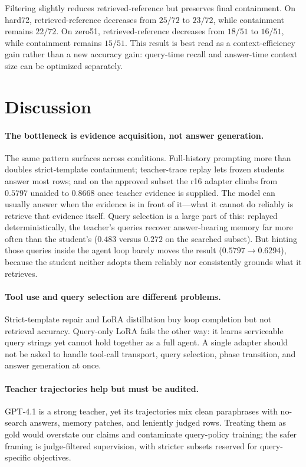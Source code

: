 \documentclass[11pt]{article}
\begin{document}
Filtering slightly reduces retrieved-reference but preserves final containment. On hard72, retrieved-reference decreases from $25/72$ to $23/72$, while containment remains $22/72$. On zero51, retrieved-reference decreases from $18/51$ to $16/51$, while containment remains $15/51$. This result is best read as a context-efficiency gain rather than a new accuracy gain: query-time recall and answer-time context size can be optimized separately.

\section{Discussion}

\paragraph{The bottleneck is evidence acquisition, not answer generation.}
The same pattern surfaces across conditions. Full-history prompting more than doubles strict-template containment; teacher-trace replay lets frozen students answer most rows; and on the approved subset the r16 adapter climbs from $0.5797$ unaided to $0.8668$ once teacher evidence is supplied. The model can usually answer when the evidence is in front of it---what it cannot do reliably is retrieve that evidence itself. Query selection is a large part of this: replayed deterministically, the teacher's queries recover answer-bearing memory far more often than the student's ($0.483$ versus $0.272$ on the searched subset). But hinting those queries inside the agent loop barely moves the result ($0.5797 \to 0.6294$), because the student neither adopts them reliably nor consistently grounds what it retrieves.

\paragraph{Tool use and query selection are different problems.}
Strict-template repair and LoRA distillation buy loop completion but not retrieval accuracy. Query-only LoRA fails the other way: it learns serviceable query strings yet cannot hold together as a full agent. A single adapter should not be asked to handle tool-call transport, query selection, phase transition, and answer generation at once.

\paragraph{Teacher trajectories help but must be audited.}
GPT-4.1 is a strong teacher, yet its trajectories mix clean paraphrases with no-search answers, memory patches, and leniently judged rows. Treating them as gold would overstate our claims and contaminate query-policy training; the safer framing is judge-filtered supervision, with stricter subsets reserved for query-specific objectives.
\end{document}
